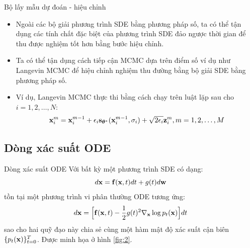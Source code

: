 \documentclass[10pt]{beamer}
\theoremstyle{remark}
\numberwithin{algocf}{section}
\numberwithin{equation}{section}
\numberwithin{dl}{section}
\numberwithin{figure}{section}
\begin{document}
\begin{frame}{Bộ lấy mẫu dự đoán - hiệu chỉnh}
	\begin{itemize}
		\item Ngoài các bộ giải phương trình SDE bằng phương pháp số, ta có thể tận dụng các tính chất đặc biệt của phương trình SDE đảo ngược thời gian để thu được nghiệm tốt hơn bằng bước hiệu chỉnh.
		\item Ta có thể tận dụng cách tiếp cận MCMC dựa trên điểm số ví dụ như Langevin MCMC để hiệu chỉnh nghiệm thu đường bằng bộ giải SDE bằng phương pháp số.
		\item Ví dụ, Langevin MCMC thực thi bằng cách chạy trên luật lặp sau cho $i=1,2,\dots, N$:
		\begin{equation*}
			\bold{x}_i^m = \bold{x}_i^{m-1} + \epsilon_i \bold{s}_{\boldsymbol{\theta}^{\ast}} (\bold{x}_i^{m-1}, \sigma_i) + \sqrt{2 \epsilon_i} \bold{z}_i^m, m = 1, 2, \dots, M
		\end{equation*}
	\end{itemize}
\end{frame}

\subsection{Dòng xác suất ODE}

\begin{frame}{Dòng xác suất ODE}
	Với bất kỳ một phương trình SDE có dạng:
	\begin{equation*}
		d \bold{x} = \bold{f} (\bold{x}, t) dt + g(t) d \bold{w}
	\end{equation*}
	tồn tại một phương trình vi phân thường ODE tương ứng:
	\begin{equation} \label{eq:13}
		d \bold{x} = \Big \lbrack \bold{f}(\bold{x}, t) - \dfrac{1}{2}g(t)^2 \nabla_{\bold{x}} \log p_t (\bold{x}) \Big \rbrack dt
	\end{equation}
	sao cho hai quỹ đạo này chia sẻ cùng một hàm mật độ xác suất cận biên $\lbrace p_t (\bold{x}) \rbrace_{t=0}^T$. Được minh họa ở hình \ref{fig:2}.
\end{frame}
\end{document}
